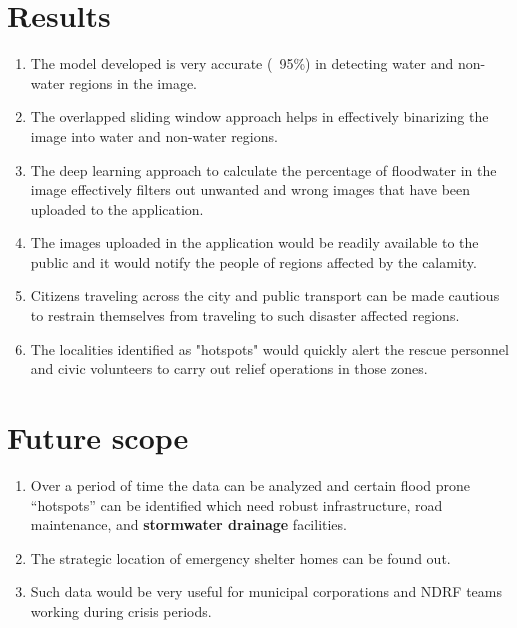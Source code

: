 \documentclass{IEEEtran}
\begin{document}
\section{Results}
\begin{enumerate}
\item The model developed is very accurate (~95\%) in detecting water and non-water regions in the image.
\item The overlapped sliding window approach helps in effectively binarizing the image into water and non-water regions.
\item The deep learning approach to calculate the percentage of floodwater in the image effectively filters out unwanted and wrong images that have been uploaded to the application.
\item The images uploaded in the application would be readily available to the public and it would notify the people of regions affected by the calamity.
\item Citizens traveling across the city and public transport can be made cautious to restrain themselves from traveling to such disaster affected regions.
\item The localities identified as "hotspots" would quickly alert the rescue personnel and civic volunteers to carry out relief operations in those zones.
\end{enumerate}
\section{Future scope}
\begin{enumerate}
\item Over a period of time the data can be analyzed and certain flood prone “hotspots” can be identified which need robust infrastructure, road maintenance, and \textbf{stormwater drainage} facilities.
\item The strategic location of emergency shelter homes can be found out.
\item Such data would be very useful for municipal corporations and NDRF teams working during crisis periods.
\end{enumerate}
\end{document}
